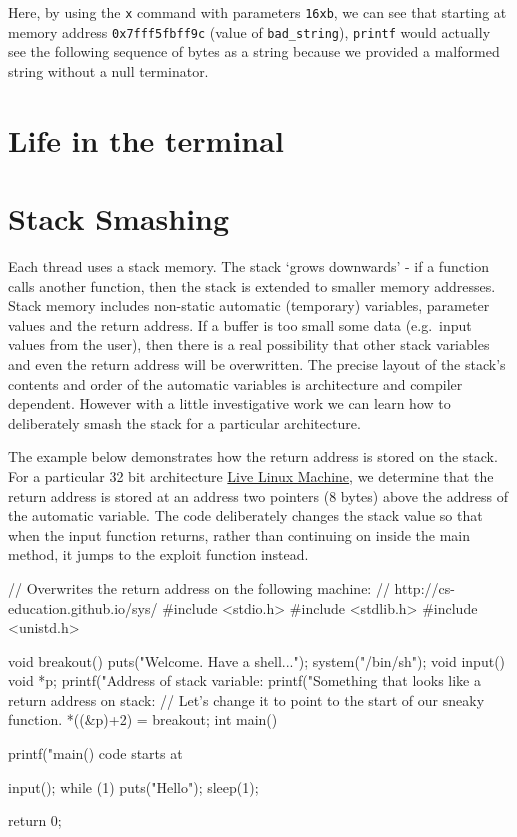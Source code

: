 Here, by using the \texttt{x} command with parameters \texttt{16xb}, we can see that starting at memory address \texttt{0x7fff5fbff9c} (value of \texttt{bad\_string}), \texttt{printf} would actually see the following sequence of bytes as a string because we provided a malformed string without a null terminator.

\section{Life in the terminal}


\section{Stack Smashing}\label{stack-smashing}

Each thread uses a stack memory. The stack `grows downwards' - if a function calls another function, then the stack is extended to smaller memory addresses. Stack memory includes non-static automatic (temporary) variables, parameter values and the return address. If a buffer is too small some data (e.g.~input values from the user), then there is a real possibility that other stack variables and even the return address will be overwritten. The precise layout of the stack's contents and order of the automatic variables is architecture and compiler dependent. However with a little investigative work we can learn how to deliberately smash the stack for a particular architecture.

The example below demonstrates how the return address is stored on the stack. For a particular 32 bit architecture \href{http://cs-education.github.io/sys/}{Live Linux Machine}, we determine that the return address is stored at an address two pointers (8 bytes) above the address of the automatic variable. The code deliberately changes the stack value so that when the input function returns, rather than continuing on inside the main method, it jumps to the exploit function instead.

\begin{code}[language=C]
// Overwrites the return address on the following machine:
// http://cs-education.github.io/sys/
#include <stdio.h>
#include <stdlib.h>
#include <unistd.h>

void breakout() {
    puts("Welcome. Have a shell...");
    system("/bin/sh");
}
void input() {
  void *p;
  printf("Address of stack variable: %
  printf("Something that looks like a return address on stack: %
  // Let's change it to point to the start of our sneaky function.
  *((&p)+2) = breakout;
}
int main() {
    printf("main() code starts at %
    
    input();
    while (1) {
        puts("Hello");
        sleep(1);
    }

    return 0;
}
\end{code}

